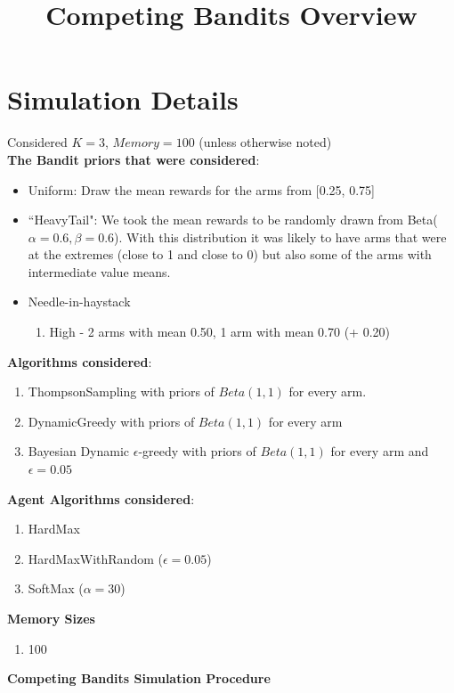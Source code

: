 \documentclass[11pt,letterpaper]{article}
\begin{document}
 

\title{Competing Bandits Overview}
\maketitle

\section*{Simulation Details}

Considered $K = 3$, $Memory = 100$ (unless otherwise noted) \\
\textbf{The Bandit priors that were considered}:
\begin{itemize}
\item Uniform: Draw the mean rewards for the arms from [0.25, 0.75]
\item ``HeavyTail": We took the mean rewards to be randomly drawn from Beta($\alpha=0.6,\beta=0.6$). With this distribution it was likely to have arms that were at the extremes (close to 1 and close to 0) but also some of the arms with intermediate value means.
\item Needle-in-haystack
\begin{enumerate}
\item High - 2 arms with mean 0.50, 1 arm with mean 0.70 (+ 0.20)
\end{enumerate}
\end{itemize}
\textbf{Algorithms considered}:
\begin{enumerate}
\item ThompsonSampling with priors of $Beta(1, 1)$ for every arm.
\item DynamicGreedy with priors of $Beta(1, 1)$ for every arm
\item Bayesian Dynamic $\epsilon$-greedy with priors of $Beta(1, 1)$ for every arm and $\epsilon=0.05$
\end{enumerate}
\textbf{Agent Algorithms considered}:
\begin{enumerate}
\item HardMax
\item HardMaxWithRandom ($\epsilon = 0.05$)
\item SoftMax ($\alpha = 30$)
\end{enumerate}
\textbf{Memory Sizes}
\begin{enumerate}
\item 100
\end{enumerate}
\pagebreak
\textbf{Competing Bandits Simulation Procedure}
\end{document}
